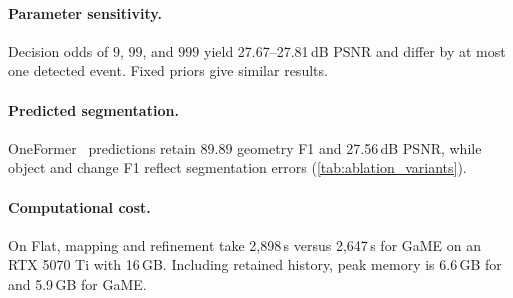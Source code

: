 \paragraph{Parameter sensitivity.}
Decision odds of $9$, $99$, and $999$ yield 27.67--27.81\,dB PSNR and differ by at most one detected event.
Fixed priors give similar results.

\paragraph{Predicted segmentation.}
OneFormer~\cite{jain2023oneformer} predictions retain 89.89 geometry F1 and 27.56\,dB PSNR,
while object and change F1 reflect segmentation errors (\cref{tab:ablation_variants}).

\paragraph{Computational cost.}
On Flat, mapping and refinement take 2,898\,s versus 2,647\,s for GaME on an RTX 5070 Ti with 16\,GB.
Including retained history, peak memory is 6.6\,GB for \ours and 5.9\,GB for GaME.
